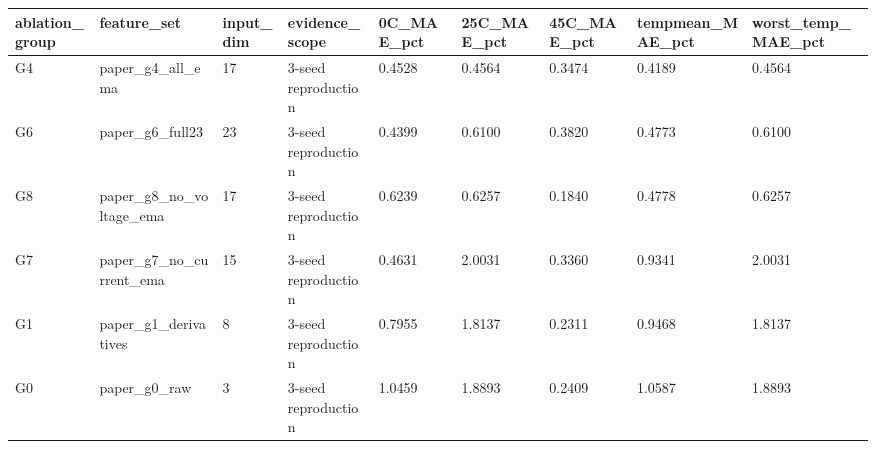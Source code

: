 \begin{tabular}{lllllllll}
\hline
ablation_group & feature_set & input_dim & evidence_scope & 0C_MAE_pct & 25C_MAE_pct & 45C_MAE_pct & tempmean_MAE_pct & worst_temp_MAE_pct \\
\hline
G4 & paper_g4_all_ema & 17 & 3-seed reproduction & 0.4528 & 0.4564 & 0.3474 & 0.4189 & 0.4564 \\
G6 & paper_g6_full23 & 23 & 3-seed reproduction & 0.4399 & 0.6100 & 0.3820 & 0.4773 & 0.6100 \\
G8 & paper_g8_no_voltage_ema & 17 & 3-seed reproduction & 0.6239 & 0.6257 & 0.1840 & 0.4778 & 0.6257 \\
G7 & paper_g7_no_current_ema & 15 & 3-seed reproduction & 0.4631 & 2.0031 & 0.3360 & 0.9341 & 2.0031 \\
G1 & paper_g1_derivatives & 8 & 3-seed reproduction & 0.7955 & 1.8137 & 0.2311 & 0.9468 & 1.8137 \\
G0 & paper_g0_raw & 3 & 3-seed reproduction & 1.0459 & 1.8893 & 0.2409 & 1.0587 & 1.8893 \\
\hline
\end{tabular}
